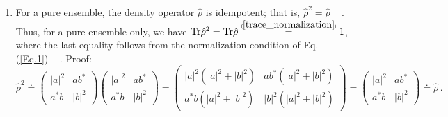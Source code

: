 \documentclass[11pt]{article}
\numberwithin{equation}{section} %
\numberwithin{figure}{section} %
\newcommand\numeq[1] %
  {\stackrel{\scriptscriptstyle(\mkern-1.5mu#1\mkern-1.5mu)}{=}}
\begin{document}
\begin{appendices}
\begin{enumerate}
  
\item For a pure ensemble, the density operator $\hat{\rho}$ is idempotent; that is, $\hat{\rho}^2=\hat{\rho}$ $\,\,\,$ \cite[p.~182, Eq.~(3.4.13)]{Sakurai}. Thus, for a pure ensemble only, we have $\textrm{Tr}\hat{\rho}^2=\textrm{Tr}\hat{\rho}\numeq{\ref{trace_normalization}}1$, where the last equality follows from the normalization condition of Eq. (\ref{Eq.1}) $\,\,\,$  \cite[p.~182, Eq.~(3.4.15)]{Sakurai}. Proof:\\

 $\hat{\rho}^2\doteq \begin{pmatrix} |a|^2&ab^* \\ a^*b&|b|^2 \end{pmatrix}\begin{pmatrix} |a|^2&ab^* \\ a^*b&|b|^2 \end{pmatrix}=\begin{pmatrix} |a|^2(|a|^2+|b|^2)&ab^*(|a|^2+|b|^2) \\ a^*b(|a|^2+|b|^2)&|b|^2(|a|^2+|b|^2) \end{pmatrix}=\begin{pmatrix} |a|^2&ab^* \\ a^*b&|b|^2 \end{pmatrix}\doteq\hat{\rho}\,\textrm{.}$
\end{enumerate}

\vspace{0.5cm}


\end{appendices}
\end{document}
